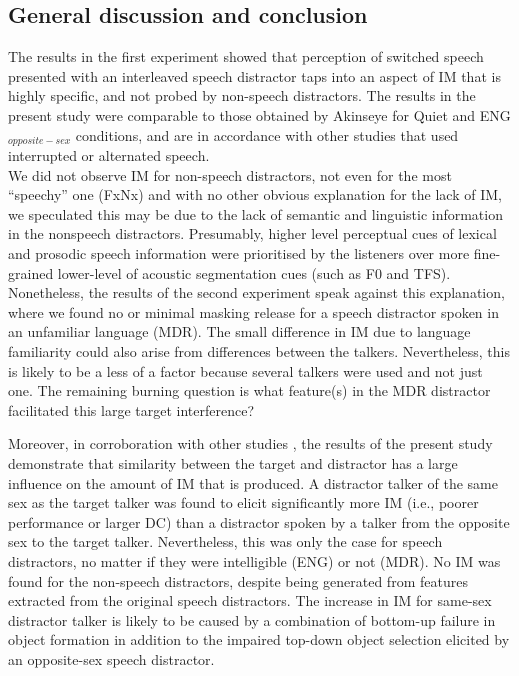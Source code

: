 \documentclass[a4paper, twoside]{templates/ociamthesis}
\begin{document}
\hypertarget{general-discussion-and-conclusion}{%
\subsection{General discussion and conclusion}\label{general-discussion-and-conclusion}}

The results in the first experiment showed that perception of switched speech presented with an interleaved speech distractor taps into an aspect of IM that is highly specific, and not probed by non-speech distractors. The results in the present study were comparable to those obtained by Akinseye \autocite*[unpublished BSc thesis,][]{Akinseye2015} for Quiet and ENG\(_{opposite-sex}\) conditions, and are in accordance with other studies that used interrupted or alternated speech.\\

We did not observe IM for non-speech distractors, not even for the most ``speechy'' one (FxNx) and with no other obvious explanation for the lack of IM, we speculated this may be due to the lack of semantic and linguistic information in the nonspeech distractors. Presumably, higher level perceptual cues of lexical and prosodic speech information were prioritised by the listeners over more fine-grained lower-level of acoustic segmentation cues (such as F0 and TFS).
Nonetheless, the results of the second experiment speak against this explanation, where we found no or minimal masking release for a speech distractor spoken in an unfamiliar language (MDR). The small difference in IM due to language familiarity could also arise from differences between the talkers. Nevertheless, this is likely to be a less of a factor because several talkers were used and not just one. The remaining burning question is what feature(s) in the MDR distractor facilitated this large target interference?

Moreover, in corroboration with other studies \autocites[e.g.,][]{Brungart2001,Festen1990}, the results of the present study demonstrate that similarity between the target and distractor has a large influence on the amount of IM that is produced. A distractor talker of the same sex as the target talker was found to elicit significantly more IM (i.e., poorer performance or larger DC) than a distractor spoken by a talker from the opposite sex to the target talker. Nevertheless, this was only the case for speech distractors, no matter if they were intelligible (ENG) or not (MDR). No IM was found for the non-speech distractors, despite being generated from features extracted from the original speech distractors. The increase in IM for same-sex distractor talker is likely to be caused by a combination of bottom-up failure in object formation in addition to the impaired top-down object selection elicited by an opposite-sex speech distractor.\\
\end{document}
